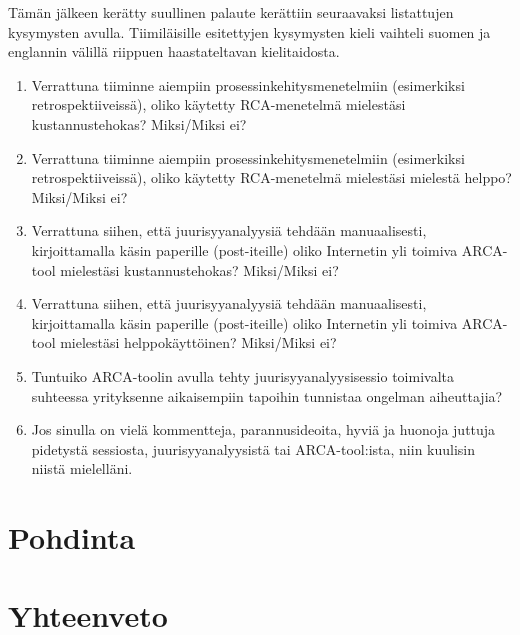 Tämän jälkeen kerätty suullinen palaute kerättiin seuraavaksi listattujen kysymysten avulla. Tiimiläisille esitettyjen kysymysten kieli vaihteli suomen ja englannin välillä riippuen haastateltavan kielitaidosta.
\begin{enumerate}
	\item Verrattuna tiiminne aiempiin prosessinkehitysmenetelmiin (esimerkiksi retrospektiiveissä), oliko käytetty RCA-menetelmä mielestäsi kustannustehokas? Miksi/Miksi ei?
	\item Verrattuna tiiminne aiempiin prosessinkehitysmenetelmiin (esimerkiksi retrospektiiveissä), oliko käytetty RCA-menetelmä mielestäsi mielestä helppo? Miksi/Miksi ei?
	\item Verrattuna siihen, että juurisyyanalyysiä tehdään manuaalisesti, kirjoittamalla käsin paperille (post-iteille) oliko Internetin yli toimiva ARCA-tool mielestäsi kustannustehokas? Miksi/Miksi ei?
	\item Verrattuna siihen, että juurisyyanalyysiä tehdään manuaalisesti, kirjoittamalla käsin paperille (post-iteille) oliko Internetin yli toimiva ARCA-tool mielestäsi helppokäyttöinen? Miksi/Miksi ei?
	\item Tuntuiko ARCA-toolin avulla tehty juurisyyanalyysisessio toimivalta suhteessa yrityksenne aikaisempiin tapoihin tunnistaa ongelman aiheuttajia?
	\item Jos sinulla on vielä kommentteja, parannusideoita, hyviä ja huonoja juttuja pidetystä sessiosta, juurisyyanalyysistä tai ARCA-tool:ista, niin kuulisin niistä mielelläni.
\end{enumerate}

\section{Pohdinta}

\section{Yhteenveto}
